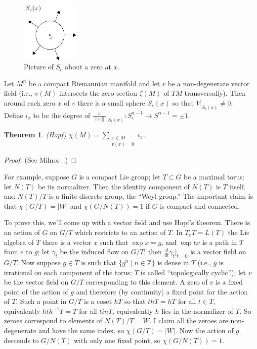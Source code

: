 \documentclass{article}
\newcommand{\Z}{\mathbb{Z}}
\newtheorem{thm}{Theorem}[section]
\begin{document}
\begin{figure}
\centering\includegraphics[width=0.25\textwidth]{figures/figure39.pdf}
\caption{\small Picture of $S_\epsilon$ about a zero at $x$.}
\end{figure}
Let $M^n$ be a compact Riemannian manifold and let $v$ be a non-degenerate vector field (i.e., $v(M)$ intersects the zero section $\zeta(M)$ of $TM$ transversally).  Then around each zero $x$ of $v$ there is a small sphere $S_\epsilon(x)$ so that $V|_{S_\epsilon(x)} \ne 0$.  Define $i_x$ to be the degree of $\frac{v}{\|v\|}|_{S_\epsilon(x)}: S^{n-1}_\epsilon \to S^{n-1} = \pm 1$.
\begin{thm}(Hopf)
$\chi(M) = \sum_{\substack{x \in M \\ v(x) = 0}} i_x$.
\end{thm}
\begin{proof}
(See Milnor~\cite{Milnor}.)
\end{proof}
For example, suppose $G$ is a compact Lie group; let $T \subset G$ be a maximal torus; let $N(T)$ be its normalizer.  Then the identity component of $N(T)$ is $T$ itself, and $N(T) / T$ is a finite discrete group, the ``Weyl group.''  The important claim is that $\chi(G / T) = |W|$ and $\chi(G / N(T)) = 1$ if $G$ is compact and connected.

To prove this, we'll come up with a vector field and use Hopf's theorem.  There is an action of $G$ on $G/T$ which restricts to an action of $T$.  In $T_eT = L(T)$ the Lie algebra of $T$ there is a vector $x$ such that $\exp x = g$, and $\exp tx$ is a path in $T$ from $e$ to $g$; let $\gamma_t$ be the induced flow on $G/T$; then $\frac{d}{dt} \gamma_t |_{t = 0}$ is a vector field on $G/T$.  Now suppose $g \in T$ is such that $\{g^n \mid n \in \Z\}$ is dense in $T$ (i.e., $g$ is irrational on each component of the torus; $T$ is called ``topologically cyclic''); let $v$ be the vector field on $G/T$ corresponding to this element.  A zero of $v$ is a fixed point of the action of $g$ and therefore (by continuity) a fixed point for the action of $T$.  Such a point in $G/T$ is a coset $hT$ so that $thT = hT$ for all $t \in T$, equivalently $hth^{-1} T = T$ for all $t in T$, equivalently $h$ lies in the normalizer of $T$.  So zeroes correspond to elements of $N(T) / T = W$.  I claim all the zeroes are non-degenerate and have the same index, so $\chi(G/T) = |W|$.  Now the action of $g$ descends to $G/N(T)$ with only one fixed point, so $\chi(G/N(T)) = 1$.
\end{document}
